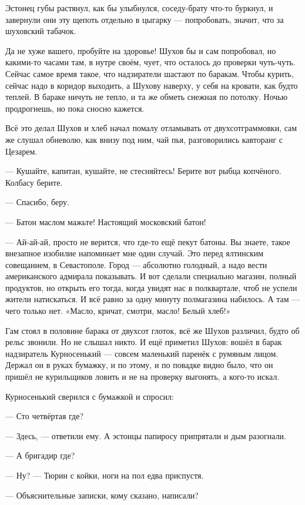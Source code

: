 Эстонец губы растянул, как бы улыбнулся, соседу-брату что-то буркнул, и завернули они эту щепоть отдельно в цыгарку --- попробовать, значит, что за шуховский табачок.

Да не хуже вашего, пробуйте на здоровье! Шухов бы и сам попробовал, но какими-то часами там, в нутре своём, чует, что осталось до проверки чуть-чуть. Сейчас самое время такое, что надзиратели шастают по баракам. Чтобы курить, сейчас надо в коридор выходить, а Шухову наверху, у себя на кровати, как будто теплей. В бараке ничуть не тепло, и та же обметь снежная по потолку. Ночью продрогнешь, но пока сносно кажется.

Всё это делал Шухов и хлеб начал помалу отламывать от двухсотграммовки, сам же слушал обневолю, как внизу под ним, чай пья, разговорились кавторанг с Цезарем.

--- Кушайте, капитан, кушайте, не стесняйтесь! Берите вот рыбца копчёного. Колбасу берите.

--- Спасибо, беру.

--- Батон маслом мажьте! Настоящий московский батон!

--- Ай-ай-ай, просто не верится, что где-то ещё пекут батоны. Вы знаете, такое внезапное изобилие напоминает мне один случай. Это перед ялтинским совещанием, в Севастополе. Город --- абсолютно голодный, а надо вести американского адмирала показывать. И вот сделали специально магазин, полный продуктов, но открыть его тогда, когда увидят нас в полквартале, чтоб не успели жители натискаться. И всё равно за одну минуту полмагазина набилось. А там --- чего только нет. «Масло, кричат, смотри, масло! Белый хлеб!»

Гам стоял в половине барака от двухсот глоток, всё же Шухов различил, будто об рельс звонили. Но не слышал никто. И ещё приметил Шухов: вошёл в барак надзиратель Курносенький --- совсем маленький паренёк с румяным лицом. Держал он в руках бумажку, и по этому, и по повадке видно было, что он пришёл не курильщиков ловить и не на проверку выгонять, а кого-то искал.

Курносенький сверился с бумажкой и спросил:

--- Сто четвёртая где?

--- Здесь, --- ответили ему. А эстонцы папиросу припрятали и дым разогнали.

--- А бригадир где?

--- Ну? --- Тюрин с койки, ноги на пол едва приспустя.

--- Объяснительные записки, кому сказано, написали?

